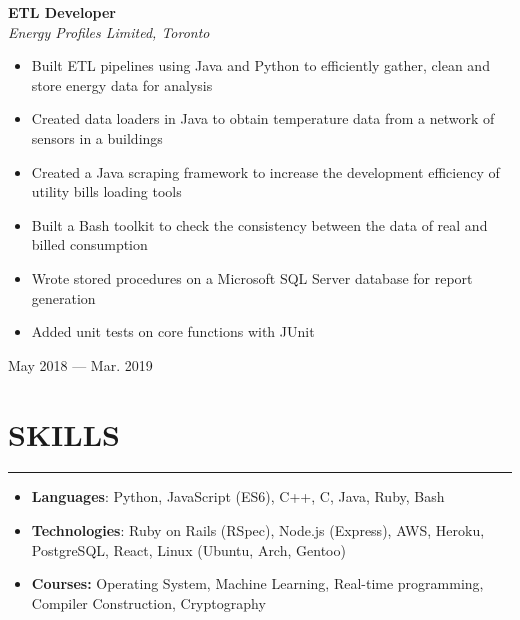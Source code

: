 \documentclass[9pt]{extarticle}
\begin{document}
\vfill

\begin{minipage}[t]{0.8\linewidth}
\begin{flushleft}
\textbf{ETL Developer}\\
\textit{Energy Profiles Limited, Toronto}
\begin{itemize}
    \item Built ETL pipelines using Java and Python
		to efficiently gather, clean and
		store energy data for analysis
    \item Created data loaders in Java
        to obtain temperature data from a network of sensors in
		a buildings
    \item Created a Java scraping framework to increase
		the development efficiency of utility bills loading tools
    \item Built a Bash toolkit to check the consistency
		between the data of real and billed consumption
    \item Wrote stored procedures on a Microsoft SQL Server database for
        report generation
    \item Added unit tests on core functions with JUnit
\end{itemize}
\end{flushleft}
\end{minipage}
\begin{minipage}[t]{0.19\linewidth}
\begin{flushright}
May 2018 --- Mar. 2019
\end{flushright}
\end{minipage}

\vfill

\section*{\large{SKILLS}}
\rule[1em]{\textwidth}{0.3pt}
\begin{itemize}
    \item \textbf{Languages}:
        Python,
		JavaScript (ES6),
		C++, C,
		Java, Ruby, Bash
    \item \textbf{Technologies}:
        Ruby on Rails (RSpec),
		Node.js (Express),
		AWS, Heroku,
		PostgreSQL,
        React,
        Linux (Ubuntu, Arch, Gentoo)
	\item \textbf{Courses:}
		Operating System, Machine Learning, Real-time programming,
Compiler Construction, Cryptography
\end{itemize}
\end{document}
